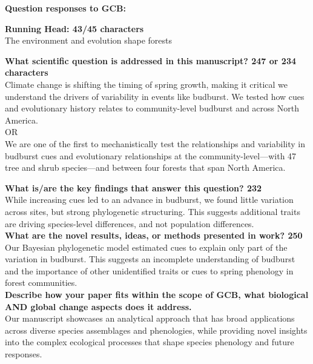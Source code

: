 \documentclass{letter}
\begin{document}
\textbf{Question responses to GCB:}


\textbf{Running Head: 43/45 characters}\\

The environment and evolution shape forests 


\textbf{What scientific question is addressed in this manuscript? 247 or 234 characters}\\

Climate change is shifting the timing of spring growth, making it critical we understand the drivers of variability in events like budburst. We tested how cues and evolutionary history relates to community-level budburst and across North America. \\

OR\\

We are one of the first to mechanistically test the relationships and variability in budburst cues and evolutionary relationships at the community-level—with 47 tree and shrub species—and between four forests that span North America. 


\textbf{What is/are the key findings that answer this question? 232}\\

While increasing cues led to an advance in budburst, we found little variation across sites, but strong phylogenetic structuring. This suggests additional traits are driving species-level differences, and not population differences.\\


\textbf{What are the novel results, ideas, or methods presented in work? 250}\\

Our Bayesian phylogenetic model estimated cues to explain only part of the variation in budburst. This suggests an incomplete understanding of budburst and the importance of other unidentified traits or cues to spring phenology in forest communities.\\

\textbf{Describe how your paper fits within the scope of GCB, what biological AND global change aspects does it address.}\\

Our manuscript showcases an analytical approach that has broad applications across diverse species assemblages and phenologies, while providing novel insights into the complex ecological processes that shape species phenology and future responses. \\
\end{document}

